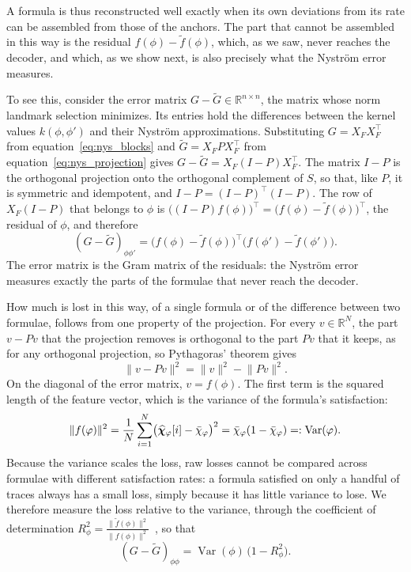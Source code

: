 \documentclass[titlepage,a4paper,11pt]{report}
\begin{document}
    A formula is thus reconstructed well exactly when its own deviations from its rate can be assembled from those of the anchors. The part that cannot be assembled in this way is the residual $f(\phi)-\tilde f(\phi)$, which, as we saw, never reaches the decoder, and which, as we show next, is also precisely what the Nyström error measures.
    
    To see this, consider the error matrix $G-\tilde G\in\mathbb R^{n\times n}$, the matrix whose norm landmark selection minimizes. Its entries hold the differences between the kernel values $k(\phi,\phi')$ and their Nyström approximations. Substituting $G=X_FX_F^\top$ from equation~\eqref{eq:nys_blocks} and $\tilde G=X_FPX_F^\top$ from equation~\eqref{eq:nys_projection} gives $G-\tilde G=X_F(I-P)X_F^\top$. The matrix $I-P$ is the orthogonal projection onto the orthogonal complement of $S$, so that, like $P$, it is symmetric and idempotent, and $I-P=(I-P)^\top(I-P)$. The row of $X_F(I-P)$ that belongs to $\phi$ is $\bigl((I-P)f(\phi)\bigr)^\top=\bigl(f(\phi)-\tilde f(\phi)\bigr)^\top$, the residual of $\phi$, and therefore
    \begin{equation}\label{eq:nys_error_residuals}
        (G-\tilde G)_{\phi\phi'} = \bigl(f(\phi)-\tilde f(\phi)\bigr)^\top \bigl(f(\phi')-\tilde f(\phi')\bigr).
    \end{equation}
    The error matrix is the Gram matrix of the residuals: the Nyström error measures exactly the parts of the formulae that never reach the decoder.

    How much is lost in this way, of a single formula or of the difference between two formulae, follows from one property of the projection. For every $v\in\mathbb R^N$, the part $v-Pv$ that the projection removes is orthogonal to the part $Pv$ that it keeps, as for any orthogonal projection, so Pythagoras' theorem gives
    \begin{equation}\label{eq:projection_loss}
        \lVert v-Pv\rVert^2=\lVert v\rVert^2-\lVert Pv\rVert^2 .
    \end{equation}
    On the diagonal of the error matrix, $v=f(\phi)$. The first term is the squared length of the feature vector, which is the variance of the formula's satisfaction:
    \begin{equation}\label{eq:norm_is_variance}
        \lVert f(\varphi)\rVert^2
        =\frac1N\sum_{i=1}^{N}\bigl(\bm{\widehat\chi}_\varphi[i]-\bar\chi_\varphi\bigr)^2
        =\bar\chi_\varphi(1-\bar\chi_\varphi)
        =:\operatorname{Var}(\varphi).
    \end{equation}
    Because the variance scales the loss, raw losses cannot be compared across formulae with different satisfaction rates: a formula satisfied on only a handful of traces always has a small loss, simply because it has little variance to lose. We therefore measure the loss relative to the variance, through the coefficient of determination $R^2_\phi=\frac{\lVert\tilde f(\phi)\rVert^2}{\lVert f(\phi)\rVert^2}$~\citep{anderson_introduction_2003}, so that
    \begin{equation}\label{eq:formula_error}
        (G-\tilde G)_{\phi\phi}=\operatorname{Var}(\phi)\,\bigl(1-R^2_\phi\bigr).
    \end{equation}
    
\end{document}
